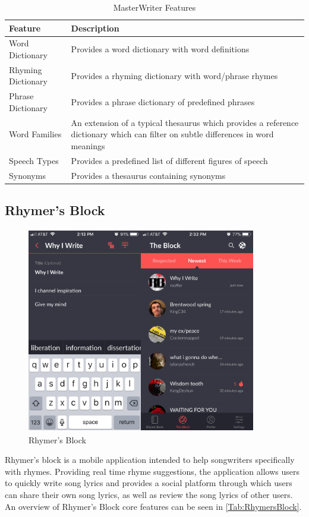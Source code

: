 \begin{table}[ht]
	\centering
	\begin{tabular}{ | l | p{10cm} |}
		\hline
		\textbf{Feature} & \textbf{Description}\\ \hline
		Word Dictionary & Provides a word dictionary with word
		definitions \\ \hline
		Rhyming Dictionary & Provides a rhyming dictionary with
		word/phrase rhymes \\ \hline
		Phrase Dictionary & Provides a phrase dictionary of predefined
		phrases \\ \hline
		Word Families & An extension of a typical thesaurus which
		provides a reference dictionary which can
		filter on subtle differences in word
		meanings \\ \hline
		Speech Types & Provides a predefined list of different
		figures of speech \\ \hline
		Synonyms & Provides a thesaurus containing
		synonyms\\ \hline
	\end{tabular}
	\label{Tab:MasterWriter}
	\caption{MasterWriter Features}
\end{table}

\noindent
\newline
\subsection{Rhymer's Block}

\begin{figure}[h]
	\includegraphics[width=10cm, height=9cm]{./figures/fig10}
	\centering
	\caption{Rhymer's Block}
	\label{fig:fig10}
\end{figure}
\noindent
\newline
Rhymer's block is a mobile application intended to help songwriters specifically with rhymes. Providing real time rhyme suggestions, the application allows users to quickly write song lyrics and provides a social platform through which users can share their own song lyrics, as well as review the song lyrics of other users. An overview of Rhymer's Block core features can be seen in \autoref{Tab:RhymersBlock}.

